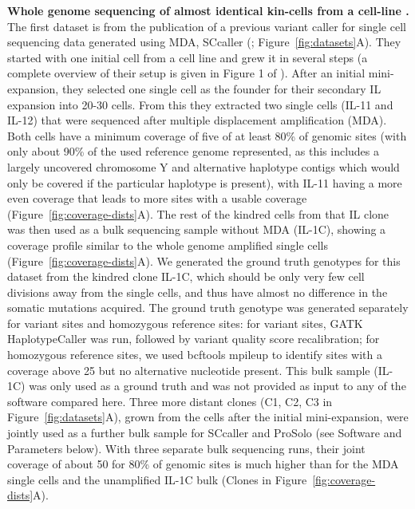 \documentclass[authoryear,preprint,11pt]{scrartcl}
\begin{document}
\textbf{Whole genome sequencing of almost identical kin-cells from a cell-line \citep{dong_accurate_2017}.}
The first dataset is from the publication of a previous variant caller for single cell sequencing data generated using MDA, SCcaller (\cite{dong_accurate_2017}; Figure~\ref{fig:datasets}A).
They started with one initial cell from a cell line and grew it in several steps (a complete overview of their setup is given in Figure 1 of \cite{dong_accurate_2017}).
After an initial mini-expansion, they selected one single cell as the founder for their secondary IL expansion into 20-30 cells.
From this they extracted two single cells (IL-11 and IL-12) that were sequenced after multiple displacement amplification (MDA).
Both cells have a minimum coverage of five of at least 80\% of genomic sites (with only about 90\% of the used reference genome represented, as this includes a largely uncovered chromosome Y and alternative haplotype contigs which would only be covered if the particular haplotype is present), with IL-11 having a more even coverage that leads to more sites with a usable coverage (Figure~\ref{fig:coverage-dists}A).
The rest of the kindred cells from that IL clone was then used as a bulk sequencing sample without MDA (IL-1C), showing a coverage profile similar to the whole genome amplified single cells (Figure~\ref{fig:coverage-dists}A).
We generated the ground truth genotypes for this dataset from the kindred clone IL-1C, which should be only very few cell divisions away from the single cells, and thus have almost no difference in the somatic mutations acquired.
The ground truth genotype was generated separately for variant sites and homozygous reference sites:
for variant sites, GATK HaplotypeCaller was run, followed by variant quality score recalibration; for homozygous reference sites, we used bcftools mpileup to identify sites with a coverage above 25 but no alternative nucleotide present.
This bulk sample (IL-1C) was only used as a ground truth and was not provided as input to any of the software compared here.
Three more distant clones (C1, C2, C3 in Figure~\ref{fig:datasets}A), grown from the cells after the initial mini-expansion, were jointly used as a further bulk sample for SCcaller and ProSolo (see Software and Parameters below).
With three separate bulk sequencing runs, their joint coverage of about 50 for 80\% of genomic sites is much higher than for the MDA single cells and the unamplified IL-1C bulk (Clones in Figure~\ref{fig:coverage-dists}A).\\
\end{document}
